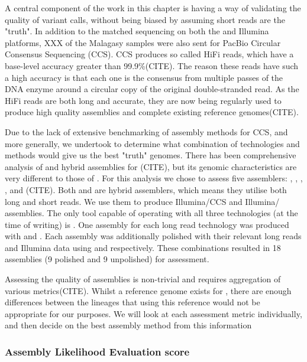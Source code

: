 A central component of the work in this chapter is having a way of validating the quality of variant calls, without being biased by assuming short reads are the "truth". In addition to the matched sequencing on both the \ont{} and Illumina platforms, XXX of the Malagasy samples were also sent for PacBio Circular Consensus Sequencing (CCS). CCS produces so called HiFi reads, which have a base-level accuracy greater than 99.9\%(CITE). The reason these reads have such a high accuracy is that each one is the consensus from multiple passes of the DNA enzyme around a circular copy of the original double-stranded read. As the HiFi reads are both long and accurate, they are now being regularly used to produce high quality \denovo{} assemblies and complete existing reference genomes(CITE).  

Due to the lack of extensive benchmarking of assembly methods for CCS, and \mtb{} more generally, we undertook to determine what combination of technologies and methods would give us the best "truth" genomes. There has been comprehensive analysis of \ont{} and hybrid assemblies for \ecoli{}(CITE), but its genomic characteristics are very different to those of \mtb{}. For this analysis we chose to assess five assemblers: , , , , and (CITE). Both  and  are hybrid assemblers, which means they utilise both long and short reads. We use them to produce Illumina/CCS and Illumina/\ont{} assemblies. The only tool capable of operating with all three technologies (at the time of writing) is . One assembly for each long read technology was produced with  and .  
Each assembly was additionally polished with their relevant long reads and Illumina data using  and  respectively. These combinations resulted in 18 assemblies (9 polished and 9 unpolished) for assessment.  

Assessing the quality of \denovo{} assemblies is non-trivial and requires aggregation of various metrics(CITE). Whilst a reference genome exists for \mtb{}, there are enough differences between the lineages that using this reference would not be appropriate for our purposes. We will look at each assessment metric individually, and then decide on the best assembly method from this information

\subsubsection{Assembly Likelihood Evaluation score}

